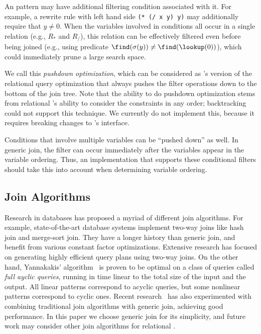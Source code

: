 An \ematching pattern may have additional filtering
 condition associated with it.
For example, a rewrite rule with left hand side \verb|(* (/ x y) y)| may
 additionally require that $y\neq 0$.
When the variables involved in conditions all occur in a single relation (e.g.,
 $R_*$ and $R_/$),
 this relation can be effectively filtered
 even before being joined
 (e.g., using predicate $\find(\sigma(y))\neq\find(\lookup(0))$),
 which could immediately prune a large search space.

We call this \textit{pushdown optimization},
 which can be considered as
 \egraph's version of the relational query
 optimization that always pushes the filter operations down to the bottom
 of the join tree.
Note
 that the ability to do pushdown optimization stems
 from relational \ematching's ability to consider the constraints in any order;
 backtracking \ematching could not support this technique.
We currently do
 not implement this,
 because it requires breaking
 changes to \egg's interface.

Conditions that involve multiple variables can be ``pushed down'' as well.
In generic join,
 the filter can occur immediately after the variables appear in the variable ordering.
Thus,
 an implementation that supports these conditional filters
 should take this into account when determining variable ordering.


\subsection{Join Algorithms}
Research in databases has proposed a myriad of different join algorithms.
For example, state-of-the-art database systems implement two-way joins
 like hash join and merge-sort join.
They have a longer history than generic join,
 and benefit from various constant factor optimizations.
Extensive research has focused on generating highly efficient query plans
 using two-way joins.
On the other hand, Yannakakis' algorithm~\cite{yannakakis}
 is proven to be optimal on a class of queries called {\em full ayclic queries},
 running in time linear to the total size of the input and the output.
All linear patterns correspond to acyclic queries,
 but some nonlinear patterns correspond to cyclic ones.
 Recent research~\cite{mhedhbi19,
 freitag} has also experimented with combining
 traditional join algorithms with generic join,
 achieving good performance.
In this paper we choose generic join for its simplicity,
 and future work may consider other join algorithms for relational \ematching.

